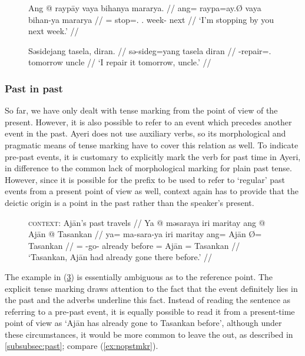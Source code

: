 \begin{figure}
\ex\label{ex:futadvbl}\begingl
	\gla Ang @ raypāy vaya bihanya mararya. //
	\glb ang= raypa=ay.Ø vaya bihan-ya mararya //
	\glc \AgtT{}= stop=\Fsg{}.\Top{} \Second{}.\Loc{} week-\Loc{} next //
	\glft `I'm stopping by you next week.' //
\endgl\xe
\end{figure}

\begin{figure}
\ex\label{ex:futemph}\begingl
	\gla Səsidejang tasela, diran. //
	\glb sə-sideg=yang tasela diran //
	\glc \Fut{}-repair=\Fsg{}.\Aarg{} tomorrow uncle //
	\glft `I  repair it tomorrow, uncle.' //
\endgl\xe
\end{figure}


\subsubsection{Past in past}

So far, we have only dealt with tense marking from the point of view of the
present. However, it is also possible to refer to an event which precedes
another event in the past. Ayeri does not use auxiliary verbs, so its
morphological and pragmatic means of tense marking have to cover this relation
as well. To indicate pre-past events, it is customary to explicitly mark the
verb for past time in Ayeri, in difference to the common lack of morphological
marking for plain past tense. However, since it is possible for the
 prefix to be used to refer to `regular' past events from a
present point of view as well, context again has to provide that the deictic
origin is a point in the past rather than the speaker's present.

\begin{figure}[h]
\ex\label{ex:pstpst}
\begingl
	\glpreamble \textsc{context:} Ajān's past travels //
	\gla Ya @ məsaraya iri maritay ang @ Ajān {} @ Tasankan //
	\glb ya= ma-sara-ya iri maritay ang= Ajān Ø= Tasankan //
	\glc \LocT{}= \Pst{}-go-\TsgM{} already before \Aarg{}= Ajān \Top{}= %
		Tasankan //
	\glft `Tasankan, Ajān had already gone there before.' //
\endgl
\xe
\end{figure}

The example in (\ref{ex:pstpst}) is essentially ambiguous as to the reference
point. The explicit tense marking draws attention to the fact that the event
definitely lies in the past and the adverbs underline this fact. Instead of
reading the sentence as referring to a pre-past event, it is equally possible
to read it from a present-time point of view as `Ajān has already gone to
Tasankan before', although under these circumstances, it would be more common
to leave the  out, as described in \autoref{subsubsec:past};
compare (\ref{ex:nopstmkr}).

